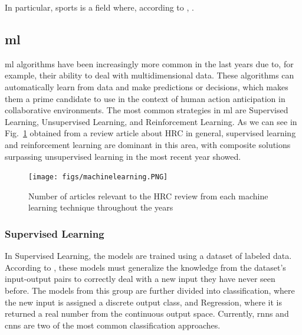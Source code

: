 In particular, sports is a field where, according to \textcite{Smith2016}, .

\subsection{\acf{ml}}

\acl{ml} algorithms have been increasingly more common in the last years due to, for example, their ability to deal with multidimensional data. These algorithms can automatically learn from data and make predictions or decisions, which makes them a prime candidate to use in the context of human action anticipation in collaborative environments. The most common strategies in \acs{ml} are Supervised Learning, Unsupervised Learning, and Reinforcement Learning. As we can see in Fig.~\ref{machinelearning} obtained from a review article about HRC in general, supervised learning and reinforcement learning are dominant in this area, with composite solutions surpassing unsupervised learning in the most recent year showed.

\begin{figure}[H]
\centerline{\texttt{[image: figs/machinelearning.PNG]}}
\caption{Number of articles relevant to the HRC review from each machine learning technique throughout the years\cite{Semeraro2023}}
\label{machinelearning}
\end{figure}
\fi

\subsubsection{Supervised Learning}

In Supervised Learning, the models are trained using a dataset of labeled data. According to \textcite{Sarker2021}, these models must generalize the knowledge from the dataset's input-output pairs to correctly deal with a new input they have never seen before. The models from this group are further divided into classification, where the new input is assigned a discrete output class, and Regression, where it is returned a real number from the continuous output space. Currently, \acs{rnn}s and \acs{cnn}s are two of the most common classification approaches.

